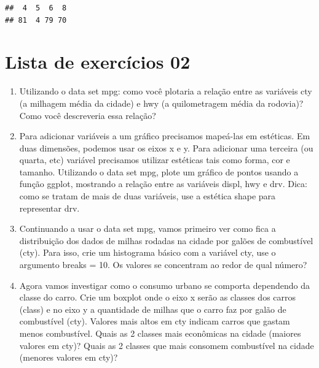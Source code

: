 \documentclass[
]{book}
\begin{document}
\begin{verbatim}
##  4  5  6  8 
## 81  4 79 70
\end{verbatim}

\hypertarget{lista-de-exercuxedcios-02}{%
\section{Lista de exercícios 02}\label{lista-de-exercuxedcios-02}}

\begin{enumerate}
\def\labelenumi{\arabic{enumi}.}
\item
  Utilizando o data set mpg: como você plotaria a relação entre as variáveis cty (a milhagem média da cidade) e hwy (a quilometragem média da rodovia)? Como você descreveria essa relação?
\item
  Para adicionar variáveis a um gráfico precisamos mapeá-las em estéticas. Em duas dimensões, podemos usar os eixos x e y. Para adicionar uma terceira (ou quarta, etc) variável precisamos utilizar estéticas tais como forma, cor e tamanho. Utilizando o data set mpg, plote um gráfico de pontos usando a função ggplot, mostrando a relação entre as variáveis displ, hwy e drv. Dica: como se tratam de mais de duas variáveis, use a estética shape para representar drv.
\item
  Continuando a usar o data set mpg, vamos primeiro ver como fica a distribuição dos dados de milhas rodadas na cidade por galões de combustível (cty). Para isso, crie um histograma básico com a variável cty, use o argumento breaks = 10. Os valores se concentram ao redor de qual número?
\item
  Agora vamos investigar como o consumo urbano se comporta dependendo da classe do
  carro. Crie um boxplot onde o eixo x serão as classes dos carros (class) e no eixo y a quantidade de milhas que o carro faz por galão de combustível (cty). Valores mais altos em cty indicam carros que gastam menos combustível. Quais as 2 classes mais econômicas na cidade (maiores valores em cty)? Quais as 2 classes que mais consomem combustível na cidade (menores valores em cty)?
\end{enumerate}

  
\end{document}
